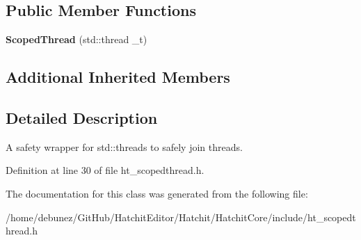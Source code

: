 \subsection*{Public Member Functions}
\begin{DoxyCompactItemize}
\item 
{\bfseries Scoped\+Thread} (std\+::thread \+\_\+t)\hypertarget{classHatchit_1_1Core_1_1ScopedThread_aee8330560a7636968f8d0d3ffe991622}{}\label{classHatchit_1_1Core_1_1ScopedThread_aee8330560a7636968f8d0d3ffe991622}

\end{DoxyCompactItemize}
\subsection*{Additional Inherited Members}


\subsection{Detailed Description}
A safety wrapper for std\+::threads to safely join threads. 

Definition at line 30 of file ht\+\_\+scopedthread.\+h.



The documentation for this class was generated from the following file\+:\begin{DoxyCompactItemize}
\item 
/home/debunez/\+Git\+Hub/\+Hatchit\+Editor/\+Hatchit/\+Hatchit\+Core/include/ht\+\_\+scopedthread.\+h\end{DoxyCompactItemize}
